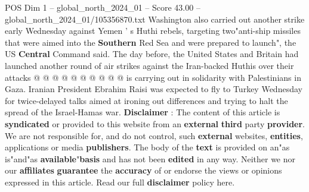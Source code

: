 \begin{textsample}{POS Dim 1 – global\_north\_2024\_01 – Score 43.00 – global\_north\_2024\_01/105356870.txt}
Washington also carried out another strike early Wednesday against Yemen ' s Huthi rebels, targeting two"anti-ship missiles that were aimed into the \textbf{Southern} Red Sea and were prepared to launch", the US \textbf{Central} Command said.
The day before, the United States and Britain had launched another round of air strikes against the Iran-backed Huthis over their attacks @ @ @ @ @ @ @ @ @ @ is carrying out in solidarity with Palestinians in Gaza.
Iranian President Ebrahim Raisi was expected to fly to Turkey Wednesday for twice-delayed talks aimed at ironing out differences and trying to halt the spread of the Israel-Hamas war. \textbf{Disclaimer} : The content of this article is \textbf{syndicated} or provided to this website from an \textbf{external} \textbf{third} party \textbf{provider}.
We are not responsible for, and do not control, such \textbf{external} websites, \textbf{entities}, applications or media \textbf{publishers}.
The body of the \textbf{text} is provided on an"as is"and"as \textbf{available}"\textbf{basis} and has not been \textbf{edited} in any way.
Neither we nor our \textbf{affiliates} \textbf{guarantee} the \textbf{accuracy} of or endorse the views or opinions expressed in this article.
Read our full \textbf{disclaimer} policy here.

\end{textsample}
